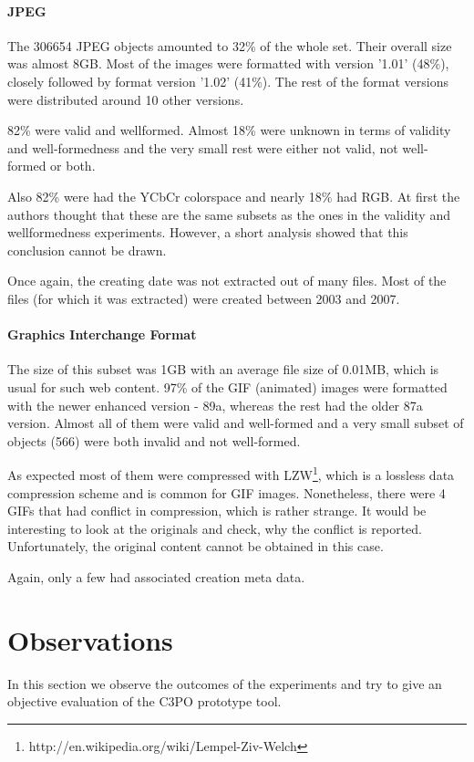 \paragraph{JPEG}
The 306654 JPEG objects amounted to 32\% of the whole set. Their overall size was almost 8GB.
Most of the images were formatted with version '1.01' (48\%), closely followed by format version '1.02' (41\%). The rest of the format versions were distributed around 10 other versions.

82\% were valid and wellformed. Almost 18\% were unknown in terms of validity and well-formedness and the very small rest were either not valid, not well-formed or both.

Also 82\% were had the YCbCr colorspace and nearly 18\% had RGB. At first the authors thought that these are the same subsets as the ones in the validity and wellformedness experiments. However, a short analysis showed that this conclusion cannot be drawn.

Once again, the creating date was not extracted out of many files. Most of the files (for which it was extracted) were created between 2003 and 2007.

\paragraph{Graphics Interchange Format}
The size of this subset was 1GB with an average file size of 0.01MB, which is usual for such web content.
97\% of the GIF (animated) images were formatted with the newer enhanced version - 89a, whereas the rest had the older 87a version. Almost all of them were valid and well-formed and a very small subset of objects (566) were both invalid and not well-formed.

As expected most of them were compressed with LZW\footnote{http://en.wikipedia.org/wiki/Lempel-Ziv-Welch}, which is a lossless data compression scheme and is common for GIF images. Nonetheless, there were 4 GIFs that had conflict in compression, which is rather strange. It would be interesting to look at the originals and check, why the conflict is reported. Unfortunately, the original content cannot be obtained in this case.

Again, only a few had associated creation meta data.

\section{Observations}
In this section we observe the outcomes of the experiments and try to give an objective evaluation of the C3PO prototype tool.

